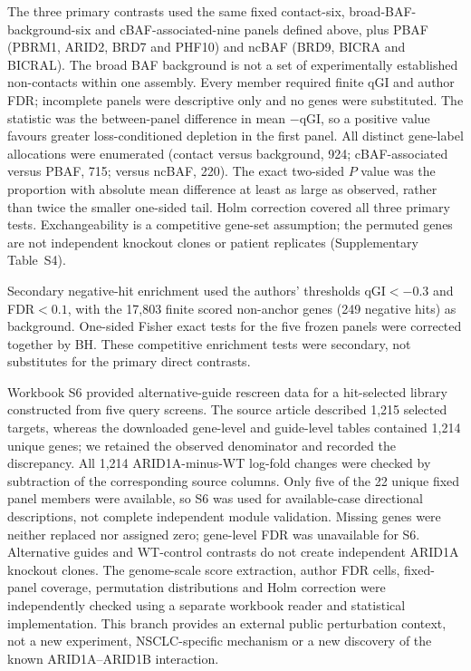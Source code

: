 \documentclass[11pt,letterpaper]{article}
\begin{document}
The three primary contrasts used the same fixed contact-six,
broad-BAF-background-six and cBAF-associated-nine panels defined above,
plus PBAF (PBRM1, ARID2, BRD7 and PHF10) and ncBAF (BRD9, BICRA and BICRAL).
The broad BAF background is not a set of experimentally established
non-contacts within one assembly. Every member required finite qGI and
author FDR; incomplete panels were descriptive only and no genes were
substituted. The statistic was the between-panel difference in mean
$-\mathrm{qGI}$, so a positive value favours greater loss-conditioned depletion
in the first panel. All distinct gene-label allocations were enumerated
(contact versus background, 924; cBAF-associated versus PBAF, 715; versus
ncBAF, 220). The exact two-sided $P$ value was the proportion with absolute
mean difference at least as large as observed, rather than twice the smaller
one-sided tail. Holm correction covered all three primary tests.
Exchangeability is a competitive gene-set assumption; the permuted genes are
not independent knockout clones or patient replicates
(Supplementary Table~S4).

Secondary negative-hit enrichment used the authors' thresholds
$\mathrm{qGI}<-0.3$ and FDR$<0.1$, with the 17{,}803 finite scored non-anchor
genes (249 negative hits) as background. One-sided Fisher exact tests for
the five frozen panels were corrected together by BH. These competitive
enrichment tests were secondary, not substitutes for the primary direct
contrasts.

Workbook S6 provided alternative-guide rescreen data for a hit-selected
library constructed from five query screens. The source article described
1{,}215 selected targets, whereas the downloaded gene-level and guide-level
tables contained 1{,}214 unique genes; we retained the observed denominator
and recorded the discrepancy. All 1{,}214 ARID1A-minus-WT log-fold changes
were checked by subtraction of the corresponding source columns. Only five
of the 22 unique fixed panel members were available, so S6 was used for
available-case directional descriptions, not complete independent module
validation. Missing genes were neither replaced nor assigned zero; gene-level
FDR was unavailable for S6. Alternative guides and WT-control
contrasts do not create independent ARID1A knockout clones. The genome-scale
score extraction, author FDR cells, fixed-panel coverage, permutation
distributions and Holm correction were independently checked using a separate
workbook reader and statistical implementation. This branch provides an
external public perturbation context, not a new experiment, NSCLC-specific
mechanism or a new discovery of the known ARID1A--ARID1B interaction.
\clearpage
\end{document}
